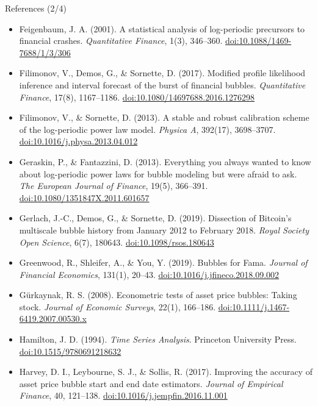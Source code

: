 \begin{frame}{References (2/4)}
\itemsize{\tiny}
\begin{itemize}
    \item Feigenbaum, J. A. (2001). A statistical analysis of log-periodic precursors to financial crashes. \textit{Quantitative Finance}, 1(3), 346--360. \href{https://doi.org/10.1088/1469-7688/1/3/306}{doi:10.1088/1469-7688/1/3/306}
    \item Filimonov, V., Demos, G., \& Sornette, D. (2017). Modified profile likelihood inference and interval forecast of the burst of financial bubbles. \textit{Quantitative Finance}, 17(8), 1167--1186. \href{https://doi.org/10.1080/14697688.2016.1276298}{doi:10.1080/14697688.2016.1276298}
    \item Filimonov, V., \& Sornette, D. (2013). A stable and robust calibration scheme of the log-periodic power law model. \textit{Physica A}, 392(17), 3698--3707. \href{https://doi.org/10.1016/j.physa.2013.04.012}{doi:10.1016/j.physa.2013.04.012}
    \item Geraskin, P., \& Fantazzini, D. (2013). Everything you always wanted to know about log-periodic power laws for bubble modeling but were afraid to ask. \textit{The European Journal of Finance}, 19(5), 366--391. \href{https://doi.org/10.1080/1351847X.2011.601657}{doi:10.1080/1351847X.2011.601657}
    \item Gerlach, J.-C., Demos, G., \& Sornette, D. (2019). Dissection of Bitcoin\textquoteright s multiscale bubble history from January 2012 to February 2018. \textit{Royal Society Open Science}, 6(7), 180643. \href{https://doi.org/10.1098/rsos.180643}{doi:10.1098/rsos.180643}
    \item Greenwood, R., Shleifer, A., \& You, Y. (2019). Bubbles for Fama. \textit{Journal of Financial Economics}, 131(1), 20--43. \href{https://doi.org/10.1016/j.jfineco.2018.09.002}{doi:10.1016/j.jfineco.2018.09.002}
    \item Gürkaynak, R. S. (2008). Econometric tests of asset price bubbles: Taking stock. \textit{Journal of Economic Surveys}, 22(1), 166--186. \href{https://doi.org/10.1111/j.1467-6419.2007.00530.x}{doi:10.1111/j.1467-6419.2007.00530.x}
    \item Hamilton, J. D. (1994). \textit{Time Series Analysis}. Princeton University Press. \href{https://doi.org/10.1515/9780691218632}{doi:10.1515/9780691218632}
    \item Harvey, D. I., Leybourne, S. J., \& Sollis, R. (2017). Improving the accuracy of asset price bubble start and end date estimators. \textit{Journal of Empirical Finance}, 40, 121--138. \href{https://doi.org/10.1016/j.jempfin.2016.11.001}{doi:10.1016/j.jempfin.2016.11.001}

\end{itemize}
\end{frame}
